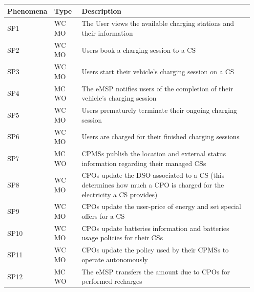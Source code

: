 \documentclass[11pt]{article}
\begin{document}
\begin{table}[H]
    \centering
    \setlength{\tabcolsep}{18pt}
    \renewcommand{\arraystretch}{1.2}
    \begin{tabularx}{\textwidth}{|>{\centering\hsize=0.3\hsize}X|>{\centering\hsize=0.3\hsize}X|>{\hsize=1.4\hsize}X|}
        \hline
        \textbf{Phenomena} & \textbf{Type} & \textbf{Description} \\
        \hline
        SP1 & WC MO & The User views the available charging stations and their information \\
        \hline
        SP2 & WC MO & Users book a charging session to a CS \\
        \hline
        SP3 & WC MO & Users start their vehicle's charging session on a CS \\
        \hline
        SP4 & MC WO & The eMSP notifies users of the completion of their vehicle's charging session \\
        \hline
        SP5 & WC MO & Users prematurely terminate their ongoing charging session \\
        \hline
        SP6 & WC MO & Users are charged for their finished charging sessions \\
        \hline
        SP7 & MC WO & CPMSs publish the location and external status information regarding their managed CSs \\
        \hline
        SP8 & WC MO & CPOs update the DSO associated to a CS (this determines how much a CPO is charged for the electricity a CS provides) \\
        \hline
        SP9 & WC MO & CPOs update the user-price of energy and set special offers for a CS \\
        \hline
        SP10 & WC MO & CPOs update batteries information and batteries usage policies for their CSs \\
        \hline
        SP11 & WC MO & CPOs update the policy used by their CPMSs to operate autonomously \\
        \hline
        SP12 & MC WO & The eMSP transfers the amount due to CPOs for performed recharges \\
        \hline
    \end{tabularx}
    \label{tab:shared_phenomena}
\end{table}
\end{document}
